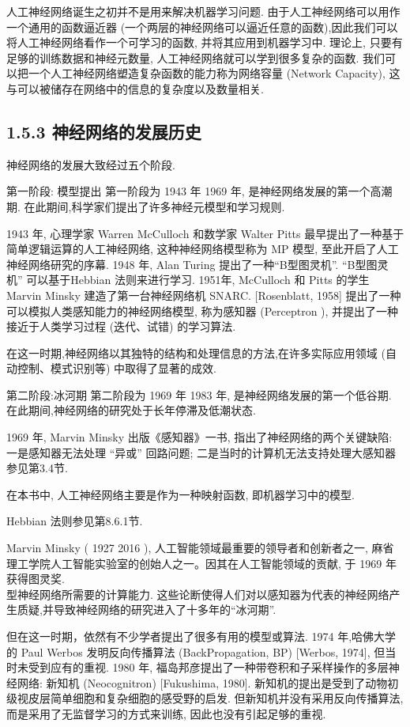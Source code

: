 \documentclass[10pt]{article}
\begin{document}
人工神经网络诞生之初并不是用来解决机器学习问题. 由于人工神经网络可以用作一个通用的函数逼近器 (一个两层的神经网络可以逼近任意的函数),因此我们可以将人工神经网络看作一个可学习的函数, 并将其应用到机器学习中. 理论上, 只要有足够的训练数据和神经元数量, 人工神经网络就可以学到很多复杂的函数. 我们可以把一个人工神经网络塑造复杂函数的能力称为网络容量 (Network Capacity), 这与可以被储存在网络中的信息的复杂度以及数量相关.

\subsection*{1.5.3 神经网络的发展历史}
神经网络的发展大致经过五个阶段.

第一阶段: 模型提出 第一阶段为 1943 年 1969 年, 是神经网络发展的第一个高潮期. 在此期间,科学家们提出了许多神经元模型和学习规则.

1943 年, 心理学家 Warren McCulloch 和数学家 Walter Pitts 最早提出了一种基于简单逻辑运算的人工神经网络, 这种神经网络模型称为 MP 模型, 至此开启了人工神经网络研究的序幕. 1948 年, Alan Turing 提出了一种“B型图灵机”. “B型图灵机” 可以基于Hebbian 法则来进行学习. 1951年, McCulloch 和 Pitts 的学生 Marvin Minsky 建造了第一台神经网络机 SNARC. [Rosenblatt, 1958] 提出了一种可以模拟人类感知能力的神经网络模型, 称为感知器 (Perceptron ), 并提出了一种接近于人类学习过程 (迭代、试错) 的学习算法.

在这一时期,神经网络以其独特的结构和处理信息的方法,在许多实际应用领域 (自动控制、模式识别等) 中取得了显著的成效.

第二阶段:冰河期 第二阶段为 1969 年 1983 年, 是神经网络发展的第一个低谷期. 在此期间,神经网络的研究处于长年停滞及低潮状态.

1969 年, Marvin Minsky 出版《感知器》一书, 指出了神经网络的两个关键缺陷: 一是感知器无法处理 “异或” 回路问题; 二是当时的计算机无法支持处理大感知器参见第3.4节.

在本书中, 人工神经网络主要是作为一种映射函数, 即机器学习中的模型.

Hebbian 法则参见第8.6.1节.

Marvin Minsky ( 1927 2016 ), 人工智能领域最重要的领导者和创新者之一, 麻省理工学院人工智能实验室的创始人之一。因其在人工智能领域的贡献, 于 1969 年获得图灵奖.\\
型神经网络所需要的计算能力. 这些论断使得人们对以感知器为代表的神经网络产生质疑,并导致神经网络的研究进入了十多年的“冰河期”.

但在这一时期，依然有不少学者提出了很多有用的模型或算法. 1974 年,哈佛大学的 Paul Werbos 发明反向传播算法 (BackPropagation, BP) [Werbos, 1974], 但当时未受到应有的重视. 1980 年, 福岛邦彦提出了一种带卷积和子采样操作的多层神经网络: 新知机 (Neocognitron) [Fukushima, 1980]. 新知机的提出是受到了动物初级视皮层简单细胞和复杂细胞的感受野的启发. 但新知机并没有采用反向传播算法, 而是采用了无监督学习的方式来训练, 因此也没有引起足够的重视.
\end{document}

